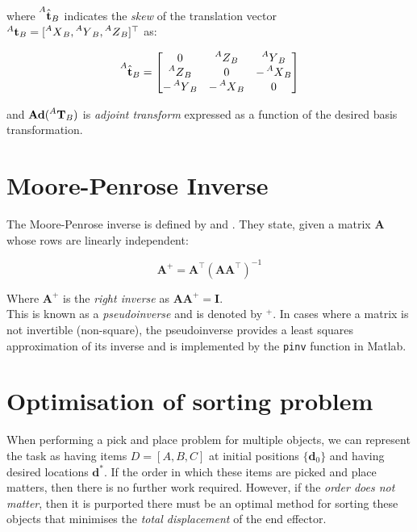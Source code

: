 \documentclass{UoNMCHA}
\numberwithin{equation}{section}
\begin{document}
where $\prescript{A}{}{\hat{\mathbf{t}}}_B$ indicates the \textit{skew} of the translation vector $ \prescript{A}{}{\mathbf{t}}_B = [\prescript{A}{}{X}_B , \prescript{A}{}{Y}_B , \prescript{A}{}{Z}_B]^{\top} $ as:

\begin{equation}
	\prescript{A}{}{\hat{\mathbf{t}}}_B = 
	\begin{bmatrix}
		0          & \prescript{A}{}{Z}_B         & \prescript{A}{}{Y}_B  \\
		\prescript{A}{}{Z}_B   & 0  		   & -\prescript{A}{}{X}_B  \\
		-\prescript{A}{}{Y}_B  & -\prescript{A}{}{X}_B  & 0 
	\end{bmatrix} 
\end{equation}

and $\mathbf{Ad}(\prescript{A}{}{\mathbf{T}}_B)$ is \textit{adjoint transform} expressed as a function of the desired basis transformation.



\section{Moore-Penrose Inverse}\label{Pseudoinverse}

The Moore-Penrose inverse is defined by \cite{moore1920reciprocal} and \cite{penrose1955generalized}. They state, given a matrix $\mathbf{A}$ whose rows are linearly independent:

\begin{equation}
	\mathbf{A}^{+} = \mathbf{A}^{\top}(\mathbf{A} \mathbf{A}^{\top})^{-1}
\end{equation}

Where $\mathbf{A}^{+}$ is the \textit{right inverse} as $\mathbf{A}	\mathbf{A}^{+} = \mathbf{I}$. \\
This is known as a \textit{pseudoinverse} and is denoted by $^{+}$. In cases where a matrix is not invertible (non-square), the pseudoinverse provides a least squares approximation of its inverse and is implemented by the \texttt{pinv} function in Matlab.



\section{Optimisation of sorting problem}

When performing a pick and place problem for multiple objects, we can represent the task as having items $ D = [A,B,C]$ at initial positions $\{\mathbf{d}_0\}$ and having desired locations $\mathbf{d}^*$. If the order in which these items are picked and place matters, then there is no further work required. However, if the \textit{order does not matter}, then it is purported there must be an optimal method for sorting these objects that minimises the \textit{total displacement} of the end effector. \
\end{document}
